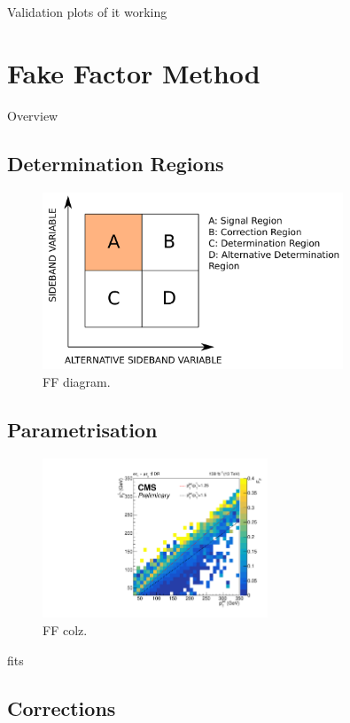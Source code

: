 Validation plots of it working

\section{Fake Factor Method}

Overview

\subsection{Determination Regions}

\begin{figure}[!hbtp]
\centering
    \includegraphics[width=0.8\textwidth]{Figures/ff_diagram.pdf}
\caption{FF diagram.}
\label{fig:ff_schematic}
\end{figure}

\subsection{Parametrisation}

\begin{figure}[!hbtp]
\centering
    \includegraphics[width=0.6\textwidth]{Figures/ff_colz_ttbar_lt.pdf}
\caption{FF colz.}
\label{fig:ff_colz}
\end{figure}

fits

\subsection{Corrections}

